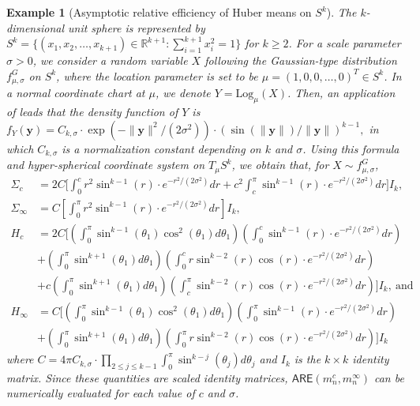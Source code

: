 \documentclass[preprint]{imsart}
\newcommand{\bbR}{\mathbb{R}}
\theoremstyle{plain}
\newtheorem{example}{Example}
\theoremstyle{remark}
\begin{document}
\begin{appendix}
%
\begin{example}[Asymptotic relative efficiency of Huber means on $S^k$]\label{0.95efficiency_spheres}
The $k$-dimensional unit sphere is represented by $S^{k}=\{(x_1,x_2, \ldots, x_{k+1}) \in \bbR^{k+1}: \sum_{i=1}^{k+1} x^2_i = 1\}$ for $k \ge 2$. For a scale parameter $\sigma>0$, we consider a random variable $X$ following the Gaussian-type distribution $f^G_{\mu,\sigma}$ on $S^k$, where the location parameter is set to be $\mu = (1, 0, 0, \ldots, 0)^{T} \in S^k$. In a normal coordinate chart at $\mu$, we denote $Y= \mbox{Log}_{\mu}(X)$. Then, an application of \citep[Lemma 3,][]{kim2020kurtosis} leads that the density function of $Y$ is  
$
f_{Y}(\mathbf{y}) = C_{k, \sigma} \cdot \exp(-\|\mathbf{y}\|^2/(2\sigma^2)) \cdot (\sin(\|\mathbf{y}\|)/\|\mathbf{y}\|)^{k-1},
$
in which $C_{k, \sigma}$ is a normalization constant depending on $k$ and $\sigma$. Using this formula and hyper-spherical coordinate system on $T_{\mu}S^k$, we obtain that, for $X\sim f^{G}_{\mu, \sigma}$, 
\begin{equation}\label{2d3d_hessianandcovariance}
\begin{aligned}
\Sigma_{c} &= 2C\big[\int_{0}^{c} r^2\sin^{k-1}(r)\cdot e^{-r^2/(2\sigma^2)} dr +c^2 \int_{c}^{\pi} \sin^{k-1}(r)\cdot e^{-r^2/(2\sigma^2)} dr\big]I_k, \\ 
\Sigma_{\infty} &= C [\int_{0}^{\pi} r^2\sin^{k-1}(r)\cdot e^{-r^2/(2\sigma^2)} dr]I_{k}, \\
H_{c} &= 2C\big[(\int_{0}^{\pi} \sin^{k-1}(\theta_1)\cos^2(\theta_1)d\theta_1)(\int_{0}^{c} \sin^{k-1}(r)\cdot e^{-r^2/(2\sigma^2)}dr) \\
& + (\int_{0}^{\pi} \sin^{k+1}(\theta_1)d\theta_1)(\int_{0}^{c} r\sin^{k-2}(r)\cos(r)\cdot e^{-r^2/(2\sigma^2)}dr) \\
& + c(\int_{0}^{\pi} \sin^{k+1}(\theta_1)d\theta_1)(\int_{c}^{\pi} \sin^{k-2}(r)\cos(r)\cdot e^{-r^2/(2\sigma^2)}dr)\big]I_{k}, ~ \mbox{and} \\
H_{\infty} &= C\big[(\int_{0}^{\pi} \sin^{k-1}(\theta_1)\cos^2(\theta_1)d\theta_1)(\int_{0}^{\pi} \sin^{k-1}(r)\cdot e^{-r^2/(2\sigma^2)}dr) \\
& + (\int_{0}^{\pi} \sin^{k+1}(\theta_1)d\theta_1)(\int_{0}^{\pi} r\sin^{k-2}(r)\cos(r)\cdot e^{-r^2/(2\sigma^2)}dr)\big]I_{k}
\end{aligned}
\end{equation}
where $C= 4\pi C_{k, \sigma} \cdot \prod_{2\le j \le k-1} \int_{0}^{\pi} \sin^{k-j}(\theta_j)d\theta_j$ and $I_k$ is the $k \times k$ identity matrix. Since these quantities are scaled identity matrices, $\textsf{ARE}(m^{c}_{n}, m^{\infty}_{n})$ can be numerically evaluated for each value of $c$ and $\sigma$. 


\end{example}
\end{appendix}
\end{document}
